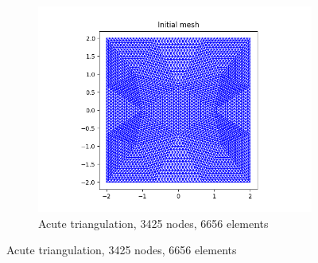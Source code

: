 \documentclass[11pt]{article}
\begin{document}
\begin{figure}
\begin{subfigure}[b]{0.45\textwidth}
    \includegraphics[scale=0.6]{grid-fine.png}
    \caption{Acute triangulation, 3425 nodes, 6656 elements}
  \end{subfigure}
\end{figure}

\newpage
\end{document}
